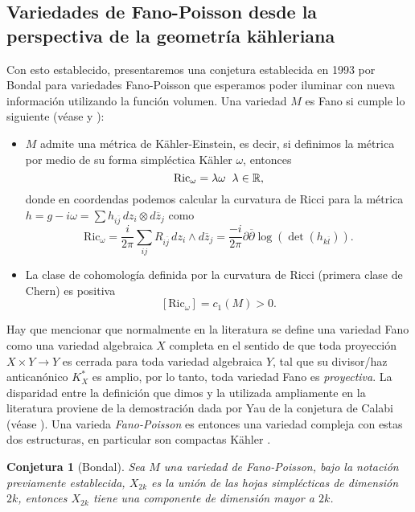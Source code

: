 \documentclass{article}
\newtheorem{conjetura}{Conjetura}
\newcommand{\re}{\ensuremath{\mathbb R }}
\begin{document}
\subsection{Variedades de Fano-Poisson desde la perspectiva de la geometr\'ia k\"ahleriana}
\noindent Con esto establecido, presentaremos una conjetura establecida en 1993 por Bondal para variedades Fano-Poisson que esperamos poder 
iluminar con nueva informaci\'on utilizando la funci\'on volumen. Una variedad $M$ es Fano si cumple lo siguiente 
(v\'ease \cite{S-Yau} y \cite{ZB}):
\begin{itemize}
        \item $M$ admite una m\'etrica de K\"ahler-Einstein, es decir, si definimos la m\'etrica por medio de su forma simpl\'ectica 
        K\"ahler $\omega$, entonces
                $$\textrm{Ric}_{\omega}=\lambda\omega\hspace{0.2cm}\lambda\in\re,$$
        donde en coordendas podemos calcular la curvatura de Ricci para la m\'etrica 
        \hbox{$h=g-i\omega=\sum h_{i\overline{j}}\,dz_i\otimes d\overline{z}_j$} como
        $$\textrm{Ric}_{\omega}=\frac{i}{2\pi}\sum_{ij}R_{i\overline{j}}\,dz_i\wedge d\overline{z}_j=\frac{-i}{2\pi}\partial\overline{\partial}\log(\det(h_{k\overline{l}})).$$
        \item La clase de cohomolog\'ia definida por la curvatura de Ricci (primera clase de Chern) es positiva
        $$
        [\textrm{Ric}_{\omega}]=c_1(M)>0.
        $$
\end{itemize}
\noindent Hay que mencionar que normalmente en la literatura se define una variedad Fano como una variedad algebraica $X$ completa 
en el sentido de que toda proyecci\'on $X\times Y\rightarrow Y$ es cerrada para toda variedad algebraica $Y$, tal que su divisor/haz antican\'onico
$K^{*}_{X}$ es amplio, por lo tanto, toda variedad Fano es \emph{proyectiva}. La disparidad entre la definici\'on que dimos y la utilizada 
ampliamente en la literatura proviene de la demostraci\'on dada por Yau de la conjetura de Calabi (v\'ease \cite{S-Yau}). Una varieda
\emph{Fano-Poisson} es entonces una variedad compleja con estas dos estructuras, en particular son compactas K\"ahler \cite{Myers}. 
\begin{conjetura}[Bondal]\label{Bondal}
         Sea $M$ una variedad de Fano-Poisson, bajo la notaci\'on previamente establecida, $X_{2k}$ es la uni\'on de las hojas 
         simpl\'ecticas de dimensi\'on $2k$, entonces $X_{2k}$ tiene una componente de dimensi\'on mayor a $2k$.
\end{conjetura}
\end{document}
